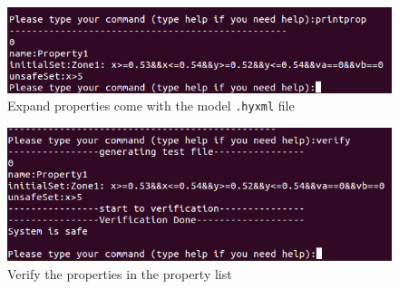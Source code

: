 \documentclass{tufte-book} %
\begin{document}
\begin{figure}
 \centerline{\includegraphics[scale=.25,keepaspectratio=true]{Manual_ver0_2_image/terminal_prop.png}}
 \caption{Expand properties come with the model \texttt{.hyxml} file} 
  \label{figure:terminalprop}
\end{figure}

\begin{figure}
 \centerline{\includegraphics[scale=.25,keepaspectratio=true]{Manual_ver0_2_image/terminal_verify.png}}
 \caption{Verify the properties in the property list} 
  \label{figure:terminalverify}
\end{figure}





\appendix
\end{document}
